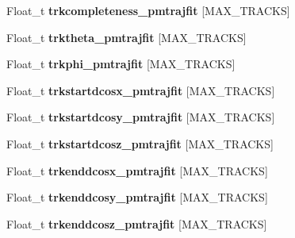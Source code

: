 \begin{DoxyCompactItemize}
\item 
\hypertarget{classanatree_a976a694f65f7f57d49f1565b2cc002f4}{Float\-\_\-t {\bfseries trkcompleteness\-\_\-pmtrajfit} \mbox{[}M\-A\-X\-\_\-\-T\-R\-A\-C\-K\-S\mbox{]}}\label{classanatree_a976a694f65f7f57d49f1565b2cc002f4}

\item 
\hypertarget{classanatree_ae5ad98ca775aae6971d1aacb0581eb38}{Float\-\_\-t {\bfseries trktheta\-\_\-pmtrajfit} \mbox{[}M\-A\-X\-\_\-\-T\-R\-A\-C\-K\-S\mbox{]}}\label{classanatree_ae5ad98ca775aae6971d1aacb0581eb38}

\item 
\hypertarget{classanatree_a6db840bbaff1fe7965232ec3548a2da9}{Float\-\_\-t {\bfseries trkphi\-\_\-pmtrajfit} \mbox{[}M\-A\-X\-\_\-\-T\-R\-A\-C\-K\-S\mbox{]}}\label{classanatree_a6db840bbaff1fe7965232ec3548a2da9}

\item 
\hypertarget{classanatree_a8acce8ecb09cdf3b6b4dcacf732ff21d}{Float\-\_\-t {\bfseries trkstartdcosx\-\_\-pmtrajfit} \mbox{[}M\-A\-X\-\_\-\-T\-R\-A\-C\-K\-S\mbox{]}}\label{classanatree_a8acce8ecb09cdf3b6b4dcacf732ff21d}

\item 
\hypertarget{classanatree_acd3ee8ea7c8c818eedc2f0ebc92545a4}{Float\-\_\-t {\bfseries trkstartdcosy\-\_\-pmtrajfit} \mbox{[}M\-A\-X\-\_\-\-T\-R\-A\-C\-K\-S\mbox{]}}\label{classanatree_acd3ee8ea7c8c818eedc2f0ebc92545a4}

\item 
\hypertarget{classanatree_a8364a06165a45dab496f635602256c8c}{Float\-\_\-t {\bfseries trkstartdcosz\-\_\-pmtrajfit} \mbox{[}M\-A\-X\-\_\-\-T\-R\-A\-C\-K\-S\mbox{]}}\label{classanatree_a8364a06165a45dab496f635602256c8c}

\item 
\hypertarget{classanatree_a7ff6f93928b5a3e1a618ffda2e6f5886}{Float\-\_\-t {\bfseries trkenddcosx\-\_\-pmtrajfit} \mbox{[}M\-A\-X\-\_\-\-T\-R\-A\-C\-K\-S\mbox{]}}\label{classanatree_a7ff6f93928b5a3e1a618ffda2e6f5886}

\item 
\hypertarget{classanatree_a48b831c5c0b76ebd1f5cfea2e89be249}{Float\-\_\-t {\bfseries trkenddcosy\-\_\-pmtrajfit} \mbox{[}M\-A\-X\-\_\-\-T\-R\-A\-C\-K\-S\mbox{]}}\label{classanatree_a48b831c5c0b76ebd1f5cfea2e89be249}

\item 
\hypertarget{classanatree_ac0bb16a328970bbfaf5956b525b2d253}{Float\-\_\-t {\bfseries trkenddcosz\-\_\-pmtrajfit} \mbox{[}M\-A\-X\-\_\-\-T\-R\-A\-C\-K\-S\mbox{]}}\label{classanatree_ac0bb16a328970bbfaf5956b525b2d253}


\end{DoxyCompactItemize}
